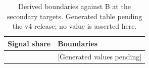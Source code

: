 \begin{table}[t]
\caption{Derived boundaries against B at the secondary targets. Generated table pending the v4 release; no value is asserted here.}\label{tab:v4-sec}
\centering\begin{tabular}{ll}\hline
Signal share & Boundaries \\\hline
[Insert generated rows] & [Generated values pending] \\\hline
\end{tabular}
\end{table}
